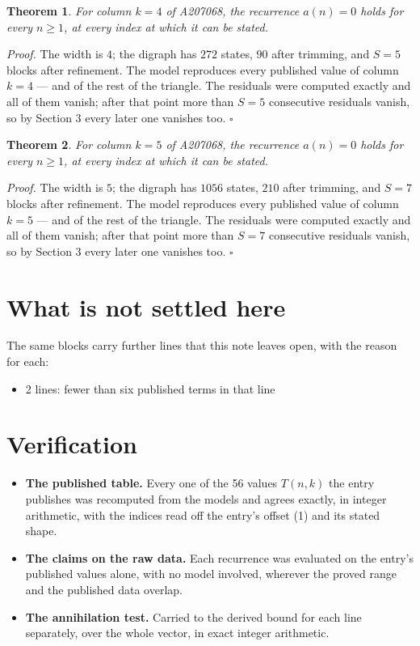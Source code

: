 \documentclass[11pt]{article}
\newtheorem{theorem}{Theorem}
\theoremstyle{definition}
\begin{document}
\begin{theorem} For column $k = 4$ of A207068, the recurrence $a(n) = 0$ holds for every $n \ge 1$, at every index at which it can be stated.\end{theorem}

{\itshape Proof.} The width is $4$; the digraph has $272$ states, $90$ after trimming, and $S = 5$ blocks after refinement. The model reproduces every published value of column $k = 4$ --- and of the rest of the triangle. The residuals were computed exactly and all of them vanish; after that point more than $S = 5$ consecutive residuals vanish, so by Section 3 every later one vanishes too. $\square$

\begin{theorem} For column $k = 5$ of A207068, the recurrence $a(n) = 0$ holds for every $n \ge 1$, at every index at which it can be stated.\end{theorem}

{\itshape Proof.} The width is $5$; the digraph has $1056$ states, $210$ after trimming, and $S = 7$ blocks after refinement. The model reproduces every published value of column $k = 5$ --- and of the rest of the triangle. The residuals were computed exactly and all of them vanish; after that point more than $S = 7$ consecutive residuals vanish, so by Section 3 every later one vanishes too. $\square$

\section{What is not settled here}

The same blocks carry further lines that this note leaves open, with the reason for each:

\begin{itemize}

\item 2 lines: fewer than six published terms in that line

\end{itemize}

\section{Verification}

\begin{itemize}

\item {\bfseries The published table.} Every one of the 56 values $T(n,k)$ the entry publishes was recomputed from the models and agrees exactly, in integer arithmetic, with the indices read off the entry's offset (1) and its stated shape.

\item {\bfseries The claims on the raw data.} Each recurrence was evaluated on the entry's published values alone, with no model involved, wherever the proved range and the published data overlap.

\item {\bfseries The annihilation test.} Carried to the derived bound for each line separately, over the whole vector, in exact integer arithmetic.

\end{itemize}
\end{document}
